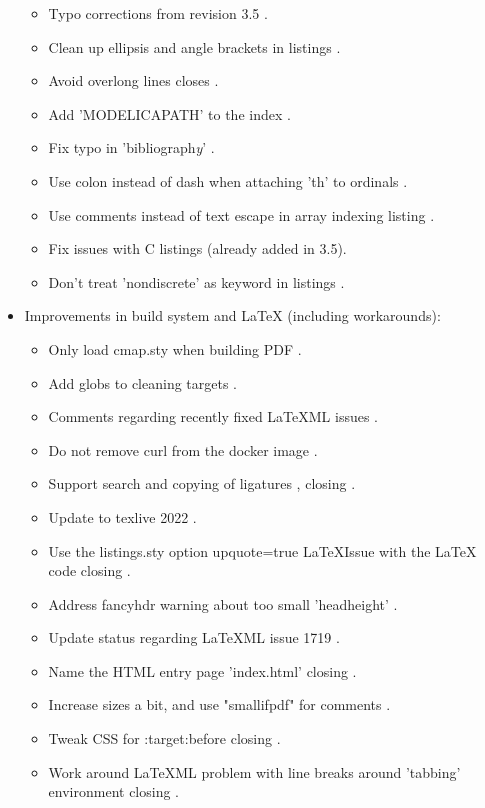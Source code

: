 \begin{itemize}
\begin{itemize}
\item Typo corrections from revision 3.5 .
\item Clean up ellipsis and angle brackets in listings .
\item Avoid overlong lines  closes .
\item Add 'MODELICAPATH' to the index .
\item Fix typo in 'bibliograph\emph{y}' .
\item Use colon instead of dash when attaching 'th' to ordinals .
\item Use comments instead of text escape in array indexing listing .
\item Fix issues with C listings  (already added in 3.5).
\item Don't treat 'nondiscrete' as keyword in listings .
\end{itemize}
\item Improvements in build system and \LaTeX{} (including workarounds):
\begin{itemize}
\item Only load cmap.sty when building PDF .
\item Add globs to cleaning targets .
\item Comments regarding recently fixed LaTeXML issues .
\item Do not remove curl from the docker image .
\item Support search and copying of ligatures ,  closing .
\item Update to texlive 2022 .
\item Use the listings.sty option upquote=true  LaTeXIssue with the LaTeX code  closing .
\item Address fancyhdr warning about too small 'headheight' .
\item Update status regarding LaTeXML issue 1719 .
\item Name the HTML entry page 'index.html'  closing .
\item Increase sizes a bit, and use "smallifpdf" for comments .
\item Tweak CSS for :target:before  closing .
\item Work around LaTeXML problem with line breaks around 'tabbing' environment  closing .

\end{itemize}
\end{itemize}
